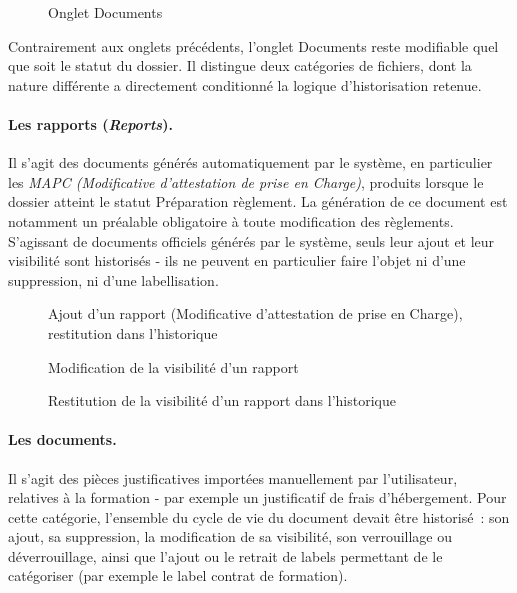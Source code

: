 \begin{figure}[H]
  \centering
  \caption{Onglet Documents}
  \label{fig:onglet-documents}
\end{figure}

Contrairement aux onglets précédents, l'onglet Documents reste
modifiable quel que soit le statut du dossier. Il distingue deux
catégories de fichiers, dont la nature différente a directement
conditionné la logique d'historisation retenue.

\paragraph{Les rapports (\textit{Reports}).}
Il s'agit des documents générés automatiquement par le système, en
particulier les \textit{MAPC (Modificative d'attestation de prise en Charge)}, produits lorsque le dossier atteint le
statut \og{}Préparation règlement\fg{}. La génération de ce document est
notamment un préalable obligatoire à toute modification des règlements.
S'agissant de documents officiels générés par le système, seuls leur
ajout et leur visibilité sont historisés  -  ils ne peuvent en particulier
faire l'objet ni d'une suppression, ni d'une labellisation.

\begin{figure}[H]
  \centering
  \caption{Ajout d'un rapport (Modificative d'attestation de prise en Charge), restitution dans l'historique}
  \label{fig:ajout-report}
\end{figure}

\begin{figure}[H]
  \centering
  \caption{Modification de la visibilité d'un rapport}
  \label{fig:visibilite-report}
\end{figure}

\begin{figure}[H]
  \centering
  \caption{Restitution de la visibilité d'un rapport dans l'historique}
  \label{fig:visibilite-report-hist}
\end{figure}

\paragraph{Les documents.}
Il s'agit des pièces justificatives importées manuellement par
l'utilisateur, relatives à la formation  -  par exemple un justificatif de
frais d'hébergement. Pour cette catégorie, l'ensemble du cycle de vie du
document devait être historisé~: son ajout, sa suppression, la
modification de sa visibilité, son verrouillage ou déverrouillage, ainsi
que l'ajout ou le retrait de labels permettant de le catégoriser (par
exemple le label \og{}contrat de formation\fg{}).

